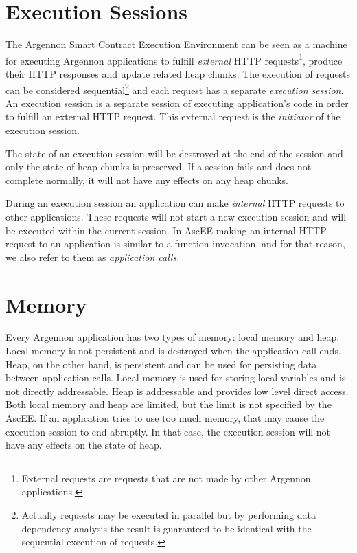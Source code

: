 \section{Execution Sessions}\label{sec:sessions}

The Argennon Smart Contract Execution Environment can be seen as a machine for executing Argennon applications to
fulfill \emph{external} HTTP requests\footnote{External requests are requests that are not made by other Argennon
applications.}, produce their HTTP responses and update related heap chunks. The execution of requests can be
considered sequential\footnote{Actually requests may be executed in parallel but by performing data dependency analysis
the result is guaranteed to be identical with the sequential execution of requests.} and each request has a separate
\emph{execution session}. An execution session is a separate session of executing application's code in
order to fulfill an external HTTP request. This external request is the \emph{initiator} of the execution session.

The state of an execution session will be
destroyed at the end of the session and only the state of heap chunks is preserved. If a session fails and does not
complete normally, it will not have any effects on any heap chunks.

During an execution session an application can make \emph{internal} HTTP requests to other applications. These
requests will not start a new execution session and will be executed within the current session. In AscEE making an
internal HTTP request to an application is similar to a function invocation, and for that reason, we also refer to
them as \emph{application calls}.


\section{Memory}\label{mem}

Every Argennon application has two types of memory: local memory and heap. Local memory is not persistent and is
destroyed when the application call ends. Heap, on the other hand, is persistent and can be used for persisting data
between application calls. Local memory is used for storing local variables and is not directly
addressable. Heap is addressable and provides low level direct access. Both local memory and heap are limited, but
the limit is not specified by the AscEE. If an application tries to use too much
memory, that may cause the execution session to end abruptly. In that case, the execution session will not have any
effects on the state of heap.

